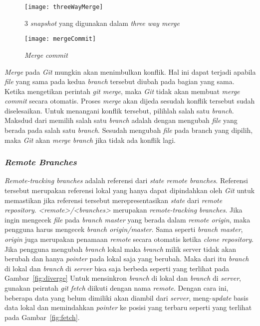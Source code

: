\begin{figure}[H]
	\centering  
	\texttt{[image: threeWayMerge]}  
	\caption[3 \textit{snapshot} yang digunakan dalam \textit{three way merge}]{3 \textit{snapshot} yang digunakan dalam \textit{three way merge}}
	\label{fig:threeWayMerge} 
\end{figure}

\begin{figure}[H]
	\centering  
	\texttt{[image: mergeCommit]}  
	\caption[\textit{Merge commit}]{\textit{Merge commit}}
	\label{fig:mergeCommit} 
\end{figure}

\textit{Merge} pada \textit{Git} mungkin akan menimbulkan konflik. Hal ini dapat terjadi apabila \textit{file} yang sama pada kedua \textit{branch} tersebut diubah pada bagian yang sama. Ketika mengetikan perintah \textit{git merge}, maka \textit{Git} tidak akan membuat \textit{merge commit} secara otomatis. Proses \textit{merge} akan dijeda sesudah konflik tersebut sudah diselesaikan. Untuk menangani konflik tersebut, pilihlah salah satu \textit{branch}. Maksdud dari memilih salah satu \textit{branch} adalah dengan mengubah \textit{file} yang berada pada salah satu \textit{branch}. Sesudah mengubah \textit{file} pada branch yang dipilih, maka \textit{Git} akan \textit{merge branch} jika tidak ada konflik lagi.

\subsubsection{\textit{Remote Branches}}
\textit{Remote-tracking branches} adalah referensi dari \textit{state remote branches}. Referensi tersebut merupakan referensi lokal yang hanya dapat dipindahkan oleh \textit{Git} untuk memastikan jika referensi tersebut merepresentasikan \textit{state} dari \textit{remote repository}. \textit{<remote>/<branches>} merupakan \textit{remote-tracking branches}. Jika ingin mengecek \textit{file} pada \textit{branch master} yang berada dalam \textit{remote origin}, maka pengguna harus mengecek \textit{branch origin/master}. Sama seperti \textit{branch master}, \textit{origin} juga merupakan penamaan \textit{remote} secara otomatis ketika \textit{clone repository}. Jika pengguna mengubah \textit{branch} lokal maka \textit{branch} milik server tidak akan berubah dan hanya \textit{pointer} pada lokal saja yang berubah. Maka dari itu \textit{branch} di lokal dan \textit{branch} di \textit{server} bisa saja berbeda seperti yang terlihat pada Gambar~\ref{fig:diverge} Untuk mensinkron \textit{branch} di lokal dan \textit{branch} di \textit{server}, gunakan peirntah \textit{git fetch} diikuti dengan nama \textit{remote}. Dengan cara ini, beberapa data yang belum dimiliki akan diambil dari \textit{server}, meng-\textit{update} basis data lokal dan memindahkan \textit{pointer} ke posisi yang terbaru seperti yang terlihat pada Gambar~\ref{fig:fetch}.\\

